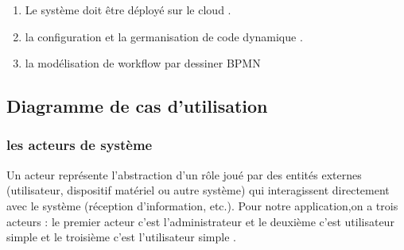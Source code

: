   \begin{enumerate}
 	\item  	   Le système doit être déployé sur le cloud  .
 	\item  	    la configuration et la germanisation de code dynamique . 
 	\item  	  la modélisation de workflow par dessiner  BPMN
 	
 
 	
 \end{enumerate}
 
 
 
 
 
 
 
 
 
 
 
\subsection{ Diagramme de cas d’utilisation }
 
  \subsubsection{ les acteurs de système  }
 
 Un acteur représente l'abstraction d'un rôle joué par des entités externes (utilisateur, dispositif matériel ou autre système) qui interagissent directement avec le système (réception d’information, etc.). Pour notre application,on a trois acteurs : le premier acteur c'est l'administrateur et le deuxième  c'est utilisateur simple  et le troisième c'est l'utilisateur simple .
 
